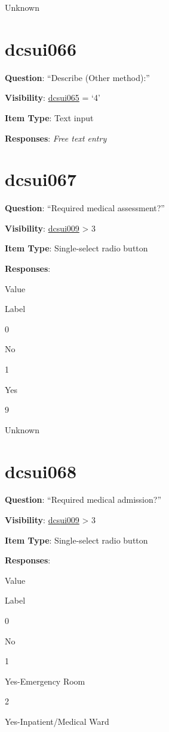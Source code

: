 \documentclass[]{book}
\begin{document}
Unknown

\hypertarget{dcsui066}{%
\section{dcsui066}\label{dcsui066}}

\textbf{Question}: ``Describe (Other method):''

\textbf{Visibility}: \protect\hyperlink{dcsui065}{dcsui065} = `4'

\textbf{Item Type}: Text input

\textbf{Responses}: \emph{Free text entry}

\hypertarget{dcsui067}{%
\section{dcsui067}\label{dcsui067}}

\textbf{Question}: ``Required medical assessment?''

\textbf{Visibility}: \protect\hyperlink{dcsui009}{dcsui009} \textgreater{} 3

\textbf{Item Type}: Single-select radio button

\textbf{Responses}:

Value

Label

0

No

1

Yes

9

Unknown

\hypertarget{dcsui068}{%
\section{dcsui068}\label{dcsui068}}

\textbf{Question}: ``Required medical admission?''

\textbf{Visibility}: \protect\hyperlink{dcsui009}{dcsui009} \textgreater{} 3

\textbf{Item Type}: Single-select radio button

\textbf{Responses}:

Value

Label

0

No

1

Yes-Emergency Room

2

Yes-Inpatient/Medical Ward
\end{document}
